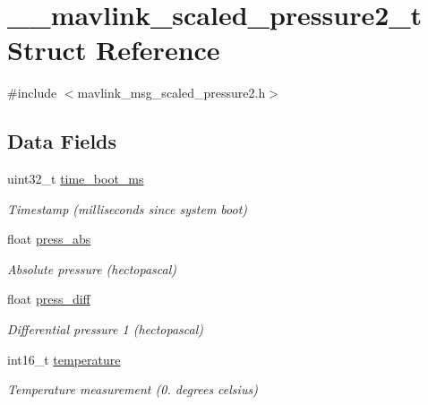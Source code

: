 \hypertarget{struct____mavlink__scaled__pressure2__t}{\section{\+\_\+\+\_\+mavlink\+\_\+scaled\+\_\+pressure2\+\_\+t Struct Reference}
\label{struct____mavlink__scaled__pressure2__t}
}


{\ttfamily \#include $<$mavlink\+\_\+msg\+\_\+scaled\+\_\+pressure2.\+h$>$}

\subsection*{Data Fields}
\begin{DoxyCompactItemize}
\item 
uint32\+\_\+t \hyperlink{struct____mavlink__scaled__pressure2__t_a4787ac83f88aafe6bd1cdc8c77eeaab2}{time\+\_\+boot\+\_\+ms}
\begin{DoxyCompactList}\small\item\em Timestamp (milliseconds since system boot) \end{DoxyCompactList}\item 
float \hyperlink{struct____mavlink__scaled__pressure2__t_a46f45f1bda8f24751d9587060838dfa7}{press\+\_\+abs}
\begin{DoxyCompactList}\small\item\em Absolute pressure (hectopascal) \end{DoxyCompactList}\item 
float \hyperlink{struct____mavlink__scaled__pressure2__t_a53e03eb25647492f811a6aff8f81f1ac}{press\+\_\+diff}
\begin{DoxyCompactList}\small\item\em Differential pressure 1 (hectopascal) \end{DoxyCompactList}\item 
int16\+\_\+t \hyperlink{struct____mavlink__scaled__pressure2__t_adc3cdcdb6b7997cd7036db4949485c9f}{temperature}
\begin{DoxyCompactList}\small\item\em Temperature measurement (0. degrees celsius) \end{DoxyCompactList}\end{DoxyCompactItemize}



